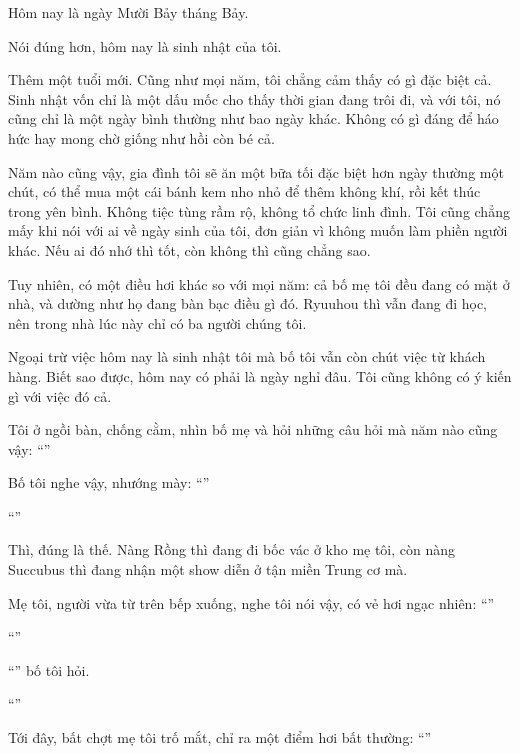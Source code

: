 \documentclass[../main.tex]{subfiles}
\begin{document}

Hôm nay là ngày Mười Bảy tháng Bảy.

Nói đúng hơn, hôm nay là sinh nhật của tôi.

Thêm một tuổi mới. Cũng như mọi năm, tôi chẳng cảm thấy có gì đặc biệt cả. Sinh nhật vốn chỉ là một dấu mốc cho thấy thời gian đang trôi đi, và với tôi, nó cũng chỉ là một ngày bình thường như bao ngày khác. Không có gì đáng để háo hức hay mong chờ giống như hồi còn bé cả.

Năm nào cũng vậy, gia đình tôi sẽ ăn một bữa tối đặc biệt hơn ngày thường một chút, có thể mua một cái bánh kem nho nhỏ để thêm không khí, rồi kết thúc trong yên bình. Không tiệc tùng rầm rộ, không tổ chức linh đình. Tôi cũng chẳng mấy khi nói với ai về ngày sinh của tôi, đơn giản vì không muốn làm phiền người khác. Nếu ai đó nhớ thì tốt, còn không thì cũng chẳng sao.

Tuy nhiên, có một điều hơi khác so với mọi năm: cả bố mẹ tôi đều đang có mặt ở nhà, và dường như họ đang bàn bạc điều gì đó. Ryuuhou thì vẫn đang đi học, nên trong nhà lúc này chỉ có ba người chúng tôi.

Ngoại trừ việc hôm nay là sinh nhật tôi mà bố tôi vẫn còn chút việc từ khách hàng. Biết sao được, hôm nay có phải là ngày nghỉ đâu. Tôi cũng không có ý kiến gì với việc đó cả.

Tôi ở ngồi bàn, chống cằm, nhìn bố mẹ và hỏi những câu hỏi mà năm nào cũng vậy: ``''

Bố tôi nghe vậy, nhướng mày: ``''

``''

Thì, đúng là thế. Nàng Rồng thì đang đi bốc vác ở kho mẹ tôi, còn nàng Succubus thì đang nhận một show diễn ở tận miền Trung cơ mà.

Mẹ tôi, người vừa từ trên bếp xuống, nghe tôi nói vậy, có vẻ hơi ngạc nhiên: ``''

``''

``'' bố tôi hỏi.

``''

Tới đây, bất chợt mẹ tôi trố mắt, chỉ ra một điểm hơi bất thường: ``''
\end{document}
